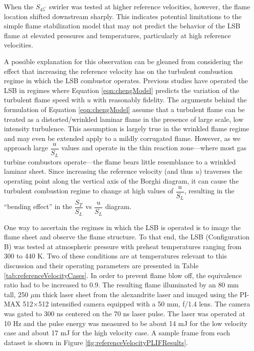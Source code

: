 When the \(S_{45^\circ}\) swirler was tested at higher reference velocities, however, the flame location shifted downstream sharply.
This indicates potential limitations to the simple flame stabilization model that may not predict the behavior of the LSB flame at elevated pressures and temperatures, particularly at high reference velocities.

A possible explanation for this observation can be gleaned from considering the effect that increasing the reference velocity has on the turbulent combustion regime in which the LSB combustor operates.
Previous studies have operated the LSB in regimes where Equation \ref{eqn:chengModel} predicts the variation of the turbulent flame speed with \(u\) with reasonably fidelity.
The arguments behind the formulation of Equation \ref{eqn:chengModel} assume that a turbulent flame can be treated as a distorted/wrinkled laminar flame in the presence of large scale, low intensity turbulence.
This assumption is largely true in the wrinkled flame regime and may even be extended apply to a mildly corrugated flame.
However, as we approach large \(\dfrac{ u }{ S_L }\) values and operate in the thin reaction zone---where most gas turbine combustors operate---the flame bears little resemblance to a wrinkled laminar sheet.
Since increasing the reference velocity (and thus \(u\)) traverses the operating point along the vertical axis of the Borghi diagram, it can cause the turbulent combustion regime to change at high values of \(\dfrac{ u }{ S_L }\), resulting in the ``bending effect'' in the \(\dfrac{ S_T }{ S_L }\) vs \(\dfrac{ u }{ S_L }\) diagram.\cite{1996-kobayashi,2006-law}

One way to ascertain the regimes in which the LSB is operated is to image the flame sheet and observe the flame structure.
To that end, the LSB (Configuration B) was tested at atmospheric pressure with preheat temperatures ranging from 300 to 440 K.
Two of these conditions are at temperatures relevant to this discussion and their operating parameters are presented in Table \ref{tab:referenceVelocityCases}.
In order to prevent flame blow off, the equivalence ratio had to be increased to 0.9.
The resulting flame illuminated by an 80 mm tall, 250 \(\mu\)m thick laser sheet from the alexandrite laser and imaged using the PI-MAX 512\(\times\)512 intensified camera equipped with a 50 mm, f/1.4 lens.
The camera was gated to 300 ns centered on the 70 ns laser pulse.
The laser was operated at 10 Hz and the pulse energy was measured to be about 14 mJ for the low velocity case and about 17 mJ for the high velocity case.
A sample frame from each dataset is shown in Figure \ref{fig:referenceVelocityPLIFResults}. 

